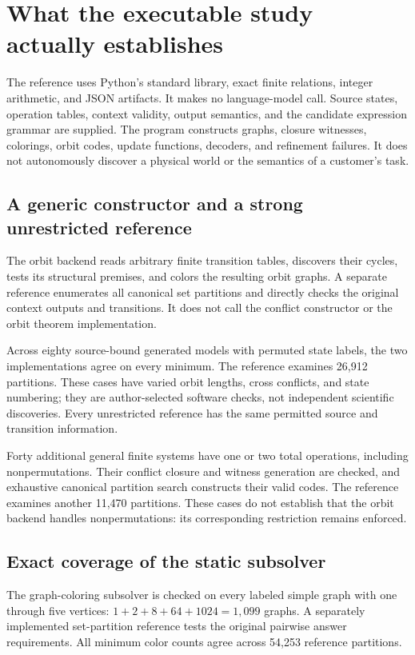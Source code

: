 \documentclass[11pt,letterpaper]{article}
\theoremstyle{remark}\newtheorem{remark}{Remark}[section]
\begin{document}
\section{What the executable study actually establishes}
\label{sec:study}
The reference uses Python's standard library, exact finite relations, integer arithmetic, and JSON artifacts. It makes no language-model call. Source states, operation tables, context validity, output semantics, and the candidate expression grammar are supplied. The program constructs graphs, closure witnesses, colorings, orbit codes, update functions, decoders, and refinement failures. It does not autonomously discover a physical world or the semantics of a customer's task.

\subsection{A generic constructor and a strong unrestricted reference}
The orbit backend reads arbitrary finite transition tables, discovers their cycles, tests its structural premises, and colors the resulting orbit graphs. A separate reference enumerates all canonical set partitions and directly checks the original context outputs and transitions. It does not call the conflict constructor or the orbit theorem implementation.

Across eighty source-bound generated models with permuted state labels, the two implementations agree on every minimum. The reference examines 26,912 partitions. These cases have varied orbit lengths, cross conflicts, and state numbering; they are author-selected software checks, not independent scientific discoveries. Every unrestricted reference has the same permitted source and transition information.

Forty additional general finite systems have one or two total operations, including nonpermutations. Their conflict closure and witness generation are checked, and exhaustive canonical partition search constructs their valid codes. The reference examines another 11,470 partitions. These cases do not establish that the orbit backend handles nonpermutations: its corresponding restriction remains enforced.

\subsection{Exact coverage of the static subsolver}
The graph-coloring subsolver is checked on every labeled simple graph with one through five vertices: $1+2+8+64+1024=1,099$ graphs. A separately implemented set-partition reference tests the original pairwise answer requirements. All minimum color counts agree across 54,253 reference partitions.
\end{document}

